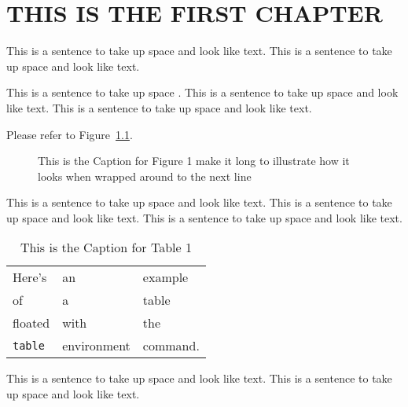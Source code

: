  
\chapter{THIS IS THE FIRST CHAPTER}
 
This is a sentence to take up space and look like text.
This is a sentence to take up space and look like text.
 
This is a sentence to take up space \cite{thisbook}.
This is a sentence to take up space and look like text.
This is a sentence to take up space and look like text.

Please refer to Figure~\ref{myfig}.  %

\begin{figure}
\centering
\vspace{2.0in} %
\caption{This is the Caption for Figure 1 make it long to illustrate
how it looks when wrapped around to the next line}
\label{myfig}  %
\end{figure}

This is a sentence to take up space and look like text.
This is a sentence to take up space and look like text.
This is a sentence to take up space and look like text.
 
\begin{table}
\caption[This is the Caption for Table 1]
            {This is the Caption for Table 1\cite{thisbook}}
\begin{center}
\begin{tabular}{lll}
Here's       & an          & example  \\
of           & a           & table    \\
floated      & with        & the      \\
\verb+table+ & environment & command.
\end{tabular}
\end{center}
\end{table}
 
This is a sentence to take up space and look like text.
This is a sentence to take up space and look like text.
 
